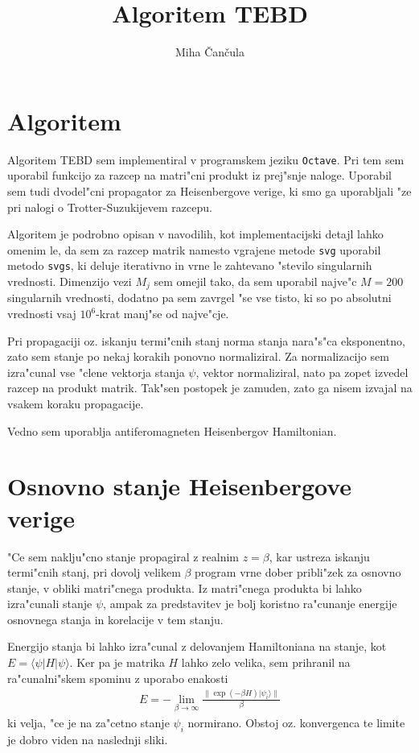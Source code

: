 \documentclass[a4paper,10pt]{article}
\title{Algoritem \textsc{TEBD}}
\author{Miha \v Can\v cula}
\begin{document}
\maketitle

\section{Algoritem}

Algoritem \textsc{TEBD} sem implementiral v programskem jeziku \texttt{Octave}.
Pri tem sem uporabil funkcijo za razcep na matri"cni produkt iz prej"snje naloge. 
Uporabil sem tudi dvodel"cni propagator za Heisenbergove verige, ki smo ga uporabljali "ze pri nalogi o Trotter-Suzukijevem razcepu. 

Algoritem je podrobno opisan v navodilih, kot implementacijski detajl lahko omenim le, da sem za razcep matrik namesto vgrajene metode \texttt{svg} uporabil metodo \texttt{svgs}, ki deluje iterativno in vrne le zahtevano "stevilo singularnih vrednosti. Dimenzijo vezi $M_j$ sem omejil tako, da sem uporabil najve"c $M = 200$ singularnih vrednosti, dodatno pa sem zavrgel "se vse tisto, ki so po absolutni vrednosti vsaj $10^6$-krat manj"se od najve"cje. 

Pri propagaciji oz. iskanju termi"cnih stanj norma stanja nara"s"ca eksponentno, zato sem stanje po nekaj korakih ponovno normaliziral. 
Za normalizacijo sem izra"cunal vse "clene vektorja stanja $\psi$, vektor normaliziral, nato pa zopet izvedel razcep na produkt matrik. 
Tak"sen postopek je zamuden, zato ga nisem izvajal na vsakem koraku propagacije. 

Vedno sem uporablja antiferomagneten Heisenbergov Hamiltonian. 

\section{Osnovno stanje Heisenbergove verige}

"Ce sem naklju"cno stanje propagiral z realnim $z = \beta$, kar ustreza iskanju termi"cnih stanj, pri dovolj velikem $\beta$ program vrne dober pribli"zek za osnovno stanje, v obliki matri"cnega produkta. Iz matri"cnega produkta bi lahko izra"cunali stanje $\psi$, ampak za predstavitev je bolj koristno ra"cunanje energije osnovnega stanja in korelacije v tem stanju. 

Energijo stanja bi lahko izra"cunal z delovanjem Hamiltoniana na stanje, kot $E = \langle \psi |H|\psi\rangle$. 
Ker pa je matrika $H$ lahko zelo velika, sem prihranil na ra"cunalni"skem spominu z uporabo enakosti 
\begin{align}
 E = -\lim_{\beta\to\infty} \frac{\|\exp(-\beta H)|\psi_i\rangle\|}{\beta}
\end{align}
ki velja, "ce je na za"cetno stanje $\psi_i$ normirano. Obstoj oz. konvergenca te limite je dobro viden na naslednji sliki. 
\end{document}
